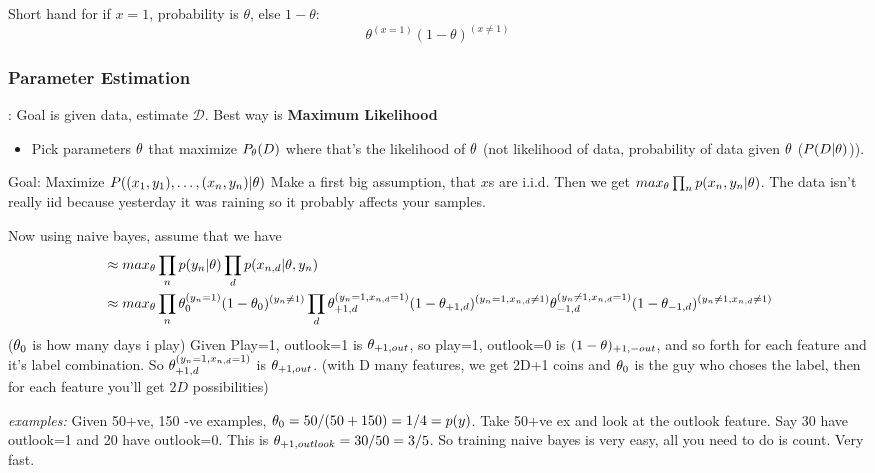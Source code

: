 Short hand for if $x=1$, probability is $\theta$, else
$1-\theta$: $$\theta^{(x=1)}(1-\theta)^{(x\neq 1)}$$

\subsubsection{Parameter Estimation}: Goal is given data, estimate
$\mathcal{D}$. Best way is \textbf{Maximum Likelihood}
\begin{itemize}
\item Pick parameters $\theta$ that maximize $P_\theta(D)$ where that's
  the likelihood of $\theta$ (not likelihood of data, probability of data
  given $\theta$ ($P(D|\theta)$)).
\end{itemize}
Goal: Maximize $P((x_1,y_1), \dots,(x_n, y_n)|\theta)$
Make a first big assumption, that $x$s are i.i.d.
Then we get $max_\theta \prod_n p(x_n, y_n|\theta)$. The data isn't really
iid because yesterday it was raining so it probably affects your
samples.

Now using naive bayes, assume that we have 
\begin{align*}
&\approx max_\theta \prod_n p(y_n|\theta)\prod_d p(x_{n, d}|\theta, y_n)\\
&\approx max_\theta \prod_n \theta_0^{(y_n=1)}(1-\theta_0)^{(y_n\neq 1)}\prod_d \theta_{+1,d}^{(y_n=1, x_{n,d}=1)}(1-\theta_{+1,
  d})^{(y_n=1, x_{n,d}\neq 1)}\theta_{-1,d}^{(y_n\neq 1,
  x_{n,d}=1)}(1-\theta_{-1,d})^{(y_n\neq 1, x_{n,d}\neq 1)}
\end{align*}
($\theta_0$ is how many days i play)
Given Play=1, outlook=1 is $\theta_{+1,out}$, so  play=1, outlook=0 is
$(1-\theta)_{+1,-out}$, and so forth for each feature and it's label
combination.
So $\theta_{+1,d}^{(y_n=1, x_{n,d}=1)}$ is $\theta_{+1, out}$.
(with D many features, we
get 2D+1 coins and $\theta_0$ is the guy who choses the label, then for
each feature you'll get $2D$ possibilities) 

\emph{examples:}
Given 50+ve, 150 -ve examples, $\theta_0 = 50/(50+150) = 1/4 = p(y)$.
Take 50+ve ex and look at the outlook feature. Say 30 have outlook=1
and 20 have outlook=0. This is $\theta_{+1, outlook} = 30/50 = 3/5$. So
training naive bayes is very easy, all you need to do is count. Very
fast.

